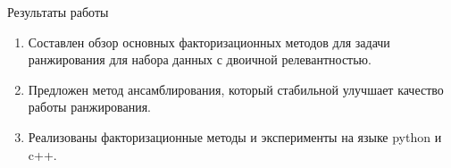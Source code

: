 \documentclass[10pt,pdf,hyperref={unicode}]{beamer}
\begin{document}
\begin{frame}{Результаты работы}

\begin{enumerate}

\item Составлен обзор основных факторизационных методов для задачи ранжирования для набора данных с двоичной релевантностью.

\item Предложен метод ансамблирования, который стабильной улучшает качество работы ранжирования.

\item Реализованы факторизационные методы  и эксперименты на языке python и c++.
\end{enumerate}

\end{frame}
\end{document}
